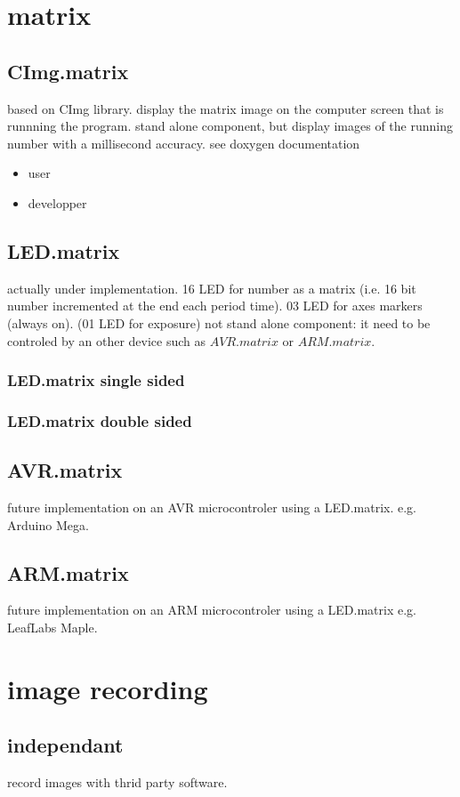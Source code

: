 \documentclass[10pt,a4paper]{report}
\begin{document}
\chapter{matrix}
\section{CImg.matrix}\label{CImg.matrix} 
based on CImg library.
display the matrix image on the computer screen that is runnning the program.
stand alone component, but display images of the running number with a millisecond accuracy.
see doxygen documentation
\begin{itemize}
\item user
\item developper
\end{itemize}
\section{LED.matrix}\label{LED.matrix} 
actually under implementation.
16 LED for number as a matrix (i.e. 16 bit number incremented at the end each period time).
03 LED for axes markers (always on).
(01 LED for exposure)
not stand alone component: it need to be controled by an other device such as $AVR.matrix$ or $ARM.matrix$.
\subsection{LED.matrix single sided}
\subsection{LED.matrix double sided}
\section{AVR.matrix}
future implementation on an AVR microcontroler using a LED.matrix.
e.g. Arduino Mega.
\section{ARM.matrix}
future implementation on an ARM microcontroler using a LED.matrix
e.g. LeafLabs Maple.

\chapter{image recording}
\section{independant}
record images with thrid party software.
\end{document}
